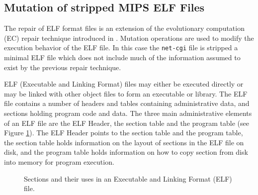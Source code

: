 \documentclass{sigcomm-alternate}
\begin{document}
\subsection{Mutation of stripped MIPS ELF Files}
\label{sec-3-2}
The repair of ELF format files is an extension of the evolutionary
computation (EC) repair technique introduced in
\cite{schulte2013embedded}.  Mutation operations are used to modify the
execution behavior of the ELF file.  In this case the \texttt{net-cgi} file
is stripped a minimal ELF file which does not include much of the
information assumed to exist by the previous repair technique.

ELF (Executable and Linking Format) \cite{tis1995tool} files may either
be executed directly or may be linked with other object files to form
an executable or library.  The ELF file contains a number of headers
and tables containing administrative data, and sections holding
program code and data.  The three main administrative elements of an
ELF file are the ELF Header, the section table and the program table
(see Figure \ref{elf}).  The ELF Header points to the section table and the
program table, the section table holds information on the layout of
sections in the ELF file on disk, and the program table holds
information on how to copy section from disk into memory for program
execution.

\begin{figure}[htb]
  \centering
{}
\caption{\label{elf}Sections and their uses in an Executable and
  Linking Format (ELF) file.}
\end{figure}
\end{document}
